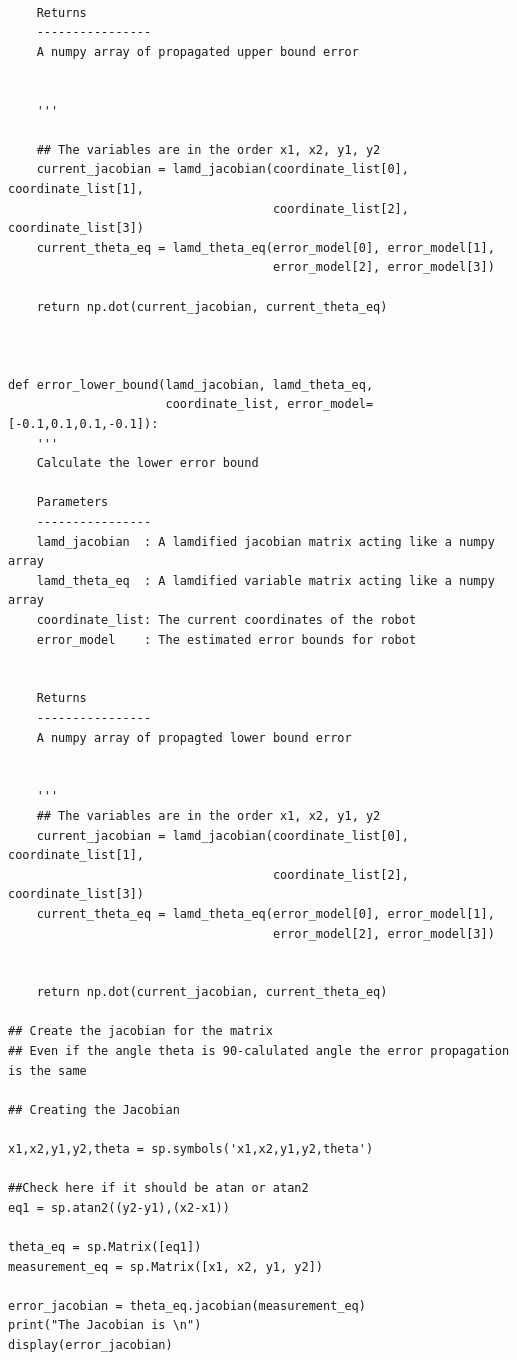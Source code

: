 {\begin{itemize}
\begin{verbatim}
    
    Returns
    ----------------
    A numpy array of propagated upper bound error
    
    
    '''
    
    ## The variables are in the order x1, x2, y1, y2
    current_jacobian = lamd_jacobian(coordinate_list[0], coordinate_list[1],
                                     coordinate_list[2], coordinate_list[3])
    current_theta_eq = lamd_theta_eq(error_model[0], error_model[1], 
                                     error_model[2], error_model[3])
    
    return np.dot(current_jacobian, current_theta_eq)
    


def error_lower_bound(lamd_jacobian, lamd_theta_eq, 
                      coordinate_list, error_model=[-0.1,0.1,0.1,-0.1]):
    '''
    Calculate the lower error bound
    
    Parameters
    ----------------
    lamd_jacobian  : A lamdified jacobian matrix acting like a numpy array
    lamd_theta_eq  : A lamdified variable matrix acting like a numpy array
    coordinate_list: The current coordinates of the robot
    error_model    : The estimated error bounds for robot
    
    
    Returns
    ----------------
    A numpy array of propagted lower bound error
    
    
    '''
    ## The variables are in the order x1, x2, y1, y2
    current_jacobian = lamd_jacobian(coordinate_list[0], coordinate_list[1],
                                     coordinate_list[2], coordinate_list[3])
    current_theta_eq = lamd_theta_eq(error_model[0], error_model[1],
                                     error_model[2], error_model[3])
   

    return np.dot(current_jacobian, current_theta_eq)
    
## Create the jacobian for the matrix
## Even if the angle theta is 90-calulated angle the error propagation is the same 

## Creating the Jacobian

x1,x2,y1,y2,theta = sp.symbols('x1,x2,y1,y2,theta')

##Check here if it should be atan or atan2
eq1 = sp.atan2((y2-y1),(x2-x1))

theta_eq = sp.Matrix([eq1])
measurement_eq = sp.Matrix([x1, x2, y1, y2])

error_jacobian = theta_eq.jacobian(measurement_eq)
print("The Jacobian is \n")
display(error_jacobian)


\end{verbatim}
\end{itemize}}
